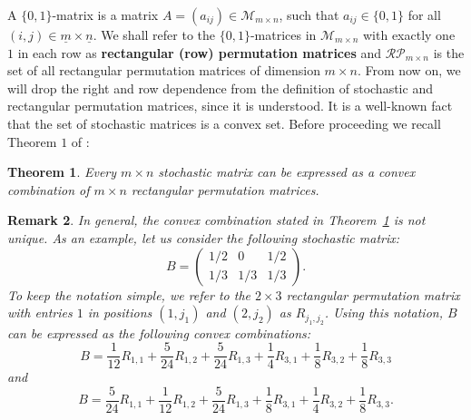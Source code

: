 \documentclass[11pt]{article}
\newtheorem{theorem}{Theorem}[section]
\newtheorem{rem}[theorem]{Remark}
\begin{document}
A $\{0,1\}$-matrix is a matrix $A=(a_{ij}) \in \mathcal{M}_{m \times n}$, such that $a_{ij} \in \{0,1\}$ for all $(i,j) \in \underline{m} \times \underline{n}$. We shall refer to the $\{0,1\}$-matrices in $\mathcal{M}_{m \times n}$ with exactly one $1$ in each row as \textbf{rectangular (row) permutation matrices} and $\mathcal{RP}_{m \times n}$ is the set of all rectangular permutation matrices of dimension $m \times n$. 
From now on, we will drop the right and row dependence from the definition of stochastic and rectangular permutation matrices, since it is understood. It is a well-known fact that the set of stochastic matrices is a convex set. Before proceeding we recall Theorem $1$ of \cite{doi:10.1080/03081087.2020.1733461}:


\begin{theorem}
\label{thmrectangular}
Every $m \times n$ stochastic matrix can be expressed as a convex combination of $m \times n$ rectangular permutation matrices.
\end{theorem}

\begin{rem}\label{notunique}
    In general, the convex combination stated in Theorem~\ref{thmrectangular} is not unique. As an example, let us consider the following stochastic matrix:
    \[ B = 
    \begin{pmatrix}
        1/2 & 0 & 1/2 \\
        1/3 & 1/3 & 1/3
    \end{pmatrix}.
    \]
    To keep the notation simple, we refer to the $2\times 3$ rectangular permutation matrix with entries $1$ in positions $(1,j_1)$ and $(2,j_2)$ as $R_{j_1,j_2}$. Using this notation, $B$ can be expressed as the following convex combinations:
    \[
        B = \frac{1}{12}R_{1,1} + \frac{5}{24}R_{1,2} + \frac{5}{24}R_{1,3} + \frac{1}{4}R_{3, 1} + \frac{1}{8}R_{3, 2} + \frac{1}{8}R_{3,3}
    \]
    and
    \[
        B = \frac{5}{24}R_{1,1} + \frac{1}{12}R_{1,2} + \frac{5}{24}R_{1,3} + \frac{1}{8}R_{3, 1} + \frac{1}{4}R_{3, 2} + \frac{1}{8}R_{3,3}.
    \]
\end{rem}
\end{document}
